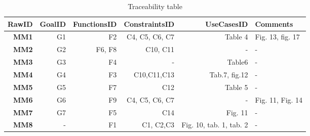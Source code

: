 \begin{table}[htp]

\begin{tabular}{rrrrrp{7cm}}
\bf\large RawID&GoalID&FunctionsID&ConstraintsID&UseCasesID&Comments\bf\large\\
\hline
\hline
\bf MM1&G1&F2&C4, C5, C6, C7&Table 4&Fig. 13, fig. 17\\
\hline
\bf MM2&G2&F6, F8&C10, C11&-&-\\
\hline
\bf MM3&G3&F4&-&Table6&-\\
\hline
\bf MM4&G4&F3&C10,C11,C13&Tab.7, fig.12&-\\
\hline
\bf MM5&G5&F7&C12&Table 5&-\\
\hline
\bf MM6&G6&F9&C4, C5, C6, C7&-&Fig. 11, Fig. 14\\
\hline
\bf MM7&G7&F5&C14&Fig. 11&-\\
\hline
\bf MM8&-&F1&C1, C2,C3&Fig. 10, tab. 1, tab. 2&-\\
\hline

\end{tabular}

\caption{Traceability table } \label{tab:traceabilitytable}
\end{table}